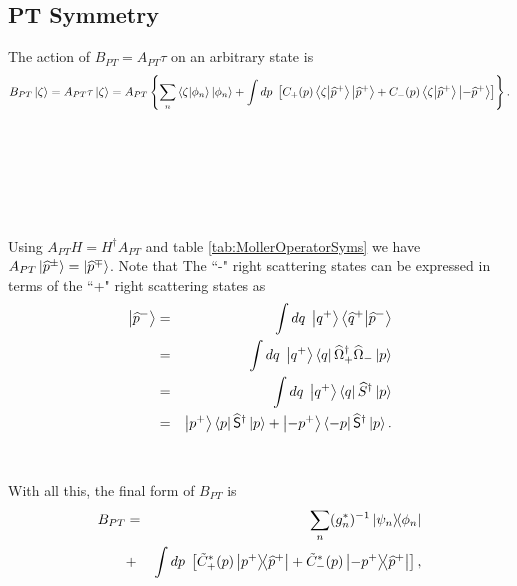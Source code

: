 \subsection{PT Symmetry}
The action of $B_{PT} = A_{PT}\tau$ on an arbitrary state is
%
\begin{equation}
    B_{PT}\ket{\zeta} = A_{PT}\tau\ket{\zeta}
                                   = A_{PT} \left\{ \sum_n \braket{\zeta}{\phi_n} \ket{\phi_n} + \int dp\; \left[ C_+(p) \braket{\zeta}{\widehat{p}^+}\ket{\widehat{p}^+} + C_-(p)\braket{\zeta}{\widehat{p}^+}\ket{-\widehat{p}^+} \right] \right\}.
\end{equation}
%
~\\
~\\
~\\
~\\
~\\
~\\
Using $A_{PT} H = H^\dagger A_{PT}$ and table \ref{tab:MollerOperatorSyms} we have $A_{PT} \ket{\widehat{p}^\pm} = \ket{\widehat{p}^\mp}$. Note that The ``-" right scattering states can be expressed in terms of the ``+" right scattering states as
%
\begin{eqnarray}
    \ket{\widehat{p}^-} &=& \int dq\; \ket{q^+}\braket{\widehat{q}^+}{\widehat{p}^-}\nonumber\\
    &=& \int dq\; \ket{q^+}\bra{q}\widehat{\Omega}_+^\dagger \widehat{\Omega}_- \ket{p}\nonumber\\
    &=& \int dq\; \ket{q^+}\bra{q} \widehat{S}^\dagger \ket{p}\nonumber\\
    &=& \ket{p^+}\bra{p} \widehat{\mathsf{S}}^\dagger \ket{p} + \ket{-p^+}\bra{-p} \widehat{\mathsf{S}}^\dagger \ket{p}.
\end{eqnarray}
%
%
~\\~\\
With all this, the final form of $B_{PT}$ is
%
\begin{eqnarray}
    B_{PT} &=&   \sum_n (g_n^*)^{-1} \ketbra{\psi_n}{\phi_n} \nonumber \\
                &+& \int dp\; \left[ \tilde{C}_+^*(p)\ketbra{p^+}{\widehat{p}^+} + \tilde{C}_-^*(p)\ketbra{-p^+}{\widehat{p}^+} \right], \nonumber \\
\label{C13}
\end{eqnarray}

